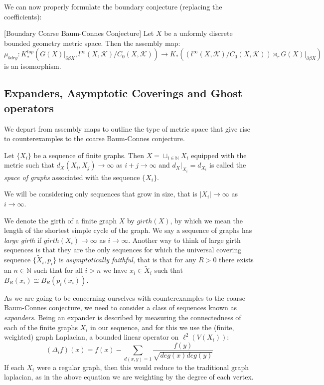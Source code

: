 We can now properly formulate the boundary conjecture (replacing the coefficients):

\begin{conj}\label{MC:S1} [Boundary Coarse Baum-Connes Conjecture]
Let $X$ be a unformly discrete bounded geometry metric space. Then the assembly map:
\begin{equation*}
\mu_{bdry}:K_{*}^{top}(G(X)|_{\partial\beta X}, l^{\infty}(X,\mathcal{K})/C_{0}(X,\mathcal{K})) \rightarrow K_{*}((l^{\infty}(X,\mathcal{K})/C_{0}(X,\mathcal{K}))\rtimes_{r}G(X)|_{\partial\beta X})
\end{equation*}
is an isomorphism.
\end{conj}
\subsection{Expanders, Asymptotic Coverings and Ghost operators}\label{Sect:GO}
We depart from assembly maps to outline the type of metric space that give rise to counterexamples to the coarse Baum-Connes conjecture.
\begin{definition}
Let $\lbrace X_{i} \rbrace$ be a sequence of finite graphs. Then $X=\sqcup_{i\in\mathbb{N}}X_{i}$ equipped with the metric such that $d_{X}(X_{i},X_{j})\rightarrow \infty$ as $i+j\rightarrow \infty$ and $d_{X}|_{X_{i}}=d_{X_{i}}$ is called the \textit{space of graphs} associated with the sequence $\lbrace X_{i} \rbrace$. 
\end{definition}

We will be considering only sequences that grow in size, that is $\vert X_{i} \vert \rightarrow \infty$ as $i \rightarrow \infty$. 

We denote the girth of a finite graph $X$ by $girth(X)$, by which we mean the length of the shortest simple cycle of the graph. We say a sequence of graphs has \textit{large girth} if $girth(X_{i})\rightarrow \infty$ as $i\rightarrow \infty$. Another way to think of large girth sequences is that they are the only sequences for which the universal covering sequence $\lbrace \tilde{X}_{i}, p_{i} \rbrace$ is \textit{asymptotically faithful}, that is that for any $R>0$ there exists an $n \in \mathbb{N}$ such that for all $i > n$ we have $x_{i} \in \tilde{X}_{i}$ such that $B_{R}(x_{i}) \cong B_{R}(p_{i}(x_{i}))$.

As we are going to be concerning ourselves with counterexamples to the coarse Baum-Connes conjecture, we need to consider a class of sequences known as \textit{expanders}. Being an expander is described by measuring the connectedness of each of the finite graphs $X_{i}$ in our sequence, and for this we use the (finite, weighted) graph Laplacian, a bounded linear operator on $\ell^{2}(V(X_{i}))$:
\begin{equation*}
(\Delta_{i}f)(x)= f(x) - \sum_{d(x,y)=1}\frac{f(y)}{\sqrt{deg(x)deg(y)}}
\end{equation*}
If each $X_{i}$ were a regular graph, then this would reduce to the traditional graph laplacian, as in the above equation we are weighting by the degree of each vertex.

